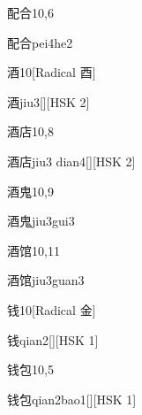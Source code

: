 \begin{entry}{配合}{10,6}
  \begin{phonetics}{配合}{pei4he2}
  \end{phonetics}
\end{entry}

\begin{entry}{酒}{10}[Radical 酉]
  \begin{phonetics}{酒}{jiu3}[][HSK 2]
  \end{phonetics}
\end{entry}

\begin{entry}{酒店}{10,8}
  \begin{phonetics}{酒店}{jiu3 dian4}[][HSK 2]
  \end{phonetics}
\end{entry}

\begin{entry}{酒鬼}{10,9}
  \begin{phonetics}{酒鬼}{jiu3gui3}
  \end{phonetics}
\end{entry}

\begin{entry}{酒馆}{10,11}
  \begin{phonetics}{酒馆}{jiu3guan3}
  \end{phonetics}
\end{entry}

\begin{entry}{钱}{10}[Radical 金]
  \begin{phonetics}{钱}{qian2}[][HSK 1]
  \end{phonetics}
\end{entry}

\begin{entry}{钱包}{10,5}
  \begin{phonetics}{钱包}{qian2bao1}[][HSK 1]
  \end{phonetics}
\end{entry}

